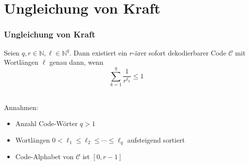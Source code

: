 \documentclass{beamer}
\begin{document}
\section{Ungleichung von Kraft}
\begin{frame}
    \frametitle{Ungleichung von Kraft}
    Seien $q,r \in \mathbb{N}, \ell \in \mathbb{N}^q$. Dann existiert ein $r$-ärer sofort dekodierbarer Code $\mathcal{C}$
    mit Wortlängen $\ell$ genau dann, wenn
    $$
        \sum_{k=1}^{q} \frac{1}{r^{\ell_k}} \leq 1
    $$\\[20pt]
    \pause

    Annahmen:

    \begin{itemize}
        \setlength\itemsep{1em}
        \item Anzahl Code-Wörter $q > 1$
        \pause
        \item Wortlängen $0 < \ell_1 \leq \ell_2 \leq \cdots \leq \ell_q$
            aufsteigend sortiert
        \pause
        \item Code-Alphabet von $\mathcal{C}$ ist $[0,r-1]$
    \end{itemize}
\end{frame}
\end{document}
